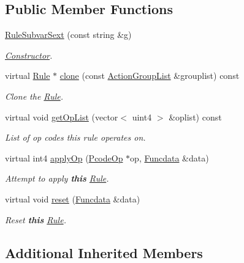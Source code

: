 \subsection*{Public Member Functions}
\begin{DoxyCompactItemize}
\item 
\mbox{\hyperlink{class_rule_subvar_sext_a901685eda8e43fb6227b436464c8d62c}{Rule\+Subvar\+Sext}} (const string \&g)
\begin{DoxyCompactList}\small\item\em \mbox{\hyperlink{class_constructor}{Constructor}}. \end{DoxyCompactList}\item 
virtual \mbox{\hyperlink{class_rule}{Rule}} $\ast$ \mbox{\hyperlink{class_rule_subvar_sext_a8221b3db32eeca254df5da4825b7a527}{clone}} (const \mbox{\hyperlink{class_action_group_list}{Action\+Group\+List}} \&grouplist) const
\begin{DoxyCompactList}\small\item\em Clone the \mbox{\hyperlink{class_rule}{Rule}}. \end{DoxyCompactList}\item 
virtual void \mbox{\hyperlink{class_rule_subvar_sext_aeda0eb1eb56bc2c5d8b54c2b01a8876b}{get\+Op\+List}} (vector$<$ uint4 $>$ \&oplist) const
\begin{DoxyCompactList}\small\item\em List of op codes this rule operates on. \end{DoxyCompactList}\item 
virtual int4 \mbox{\hyperlink{class_rule_subvar_sext_a77ff5f0a097fc96ad1a34fea4eae3821}{apply\+Op}} (\mbox{\hyperlink{class_pcode_op}{Pcode\+Op}} $\ast$op, \mbox{\hyperlink{class_funcdata}{Funcdata}} \&data)
\begin{DoxyCompactList}\small\item\em Attempt to apply {\bfseries{this}} \mbox{\hyperlink{class_rule}{Rule}}. \end{DoxyCompactList}\item 
virtual void \mbox{\hyperlink{class_rule_subvar_sext_a49bc2d4beb4624eda70e07f702aa39ab}{reset}} (\mbox{\hyperlink{class_funcdata}{Funcdata}} \&data)
\begin{DoxyCompactList}\small\item\em Reset {\bfseries{this}} \mbox{\hyperlink{class_rule}{Rule}}. \end{DoxyCompactList}\end{DoxyCompactItemize}
\subsection*{Additional Inherited Members}


